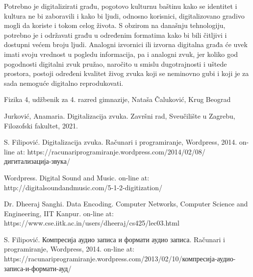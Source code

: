 \documentclass[a4paper]{article}
\begin{document}
Potrebno je digitalizirati građu, pogotovo kulturnu baštinu kako se identitet i kultura ne bi zaboravili i kako bi ljudi, odnosno korisnici, digitalizovano gradivo mogli da koriste i tokom celog života. S obzirom na današnju tehnologiju, potrebno je i održavati građu u određenim formatima kako bi bili čitljivi i dostupni većem broju ljudi.
Analogni izvornici ili izvorna digitalna građa će uvek imati svoju vrednost u pogledu informacija, pa i analogni zvuk, jer koliko god pogodnosti digitalni zvuk pružao, naročito u smislu dugotrajnosti i uštede prostora, postoji određeni kvalitet živog zvuka koji se neminovno gubi i koji je za sada nemoguće digitalno reprodukovati.


\appendix

\begin{thebibliography}{9}

 Fizika 4, udžbenik za 4. razred gimnazije, Nataša Čaluković, Krug Beograd   

 Jurković, Anamaria. Digitalizacija zvuka.  Završni rad, Sveučilište u Zagrebu, Filozofski fakultet, 2021.

 S. Filipović. Digitalizacija zvuka. Računari i programiranje, Wordpress, 2014. on-line at: https://racunariprogramiranje.wordpress.com/2014/02/08/дигитализација-звука/

 Wordpress. Digital Sound and Music. on-line at: http://digitalsoundandmusic.com/5-1-2-digitization/

 Dr. Dheeraj Sanghi. Data Encoding. Computer Networks, Computer Science and Engineering, IIT Kanpur. on-line at: https://www.cse.iitk.ac.in/users/dheeraj/cs425/lec03.html

 S. Filipović. Компресија аудио записа и формати аудио записа. Računari i programiranje, Wordpress, 2014. on-line at: https://racunariprogramiranje.wordpress.com/2013/02/10/компресија-аудио-записа-и-формати-ауд/

\end{thebibliography}
\end{document}
